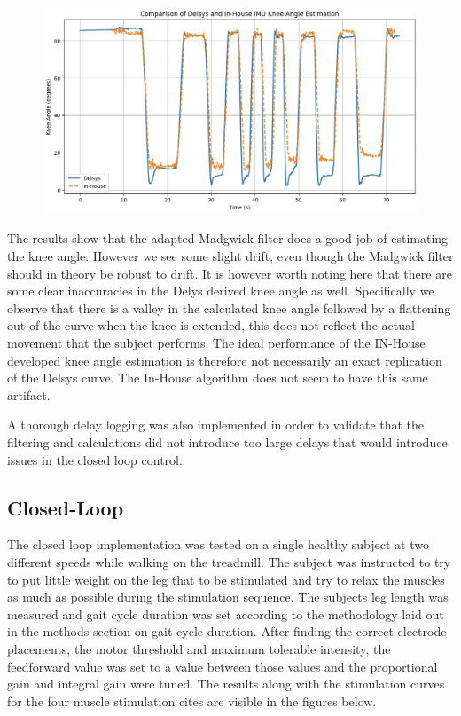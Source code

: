 \begin{figure} [H]
    \centering
    \includegraphics[width=0.95\linewidth]{images/T11_betterplotting.png}
    \caption{}
    \label{fig:t11}
\end{figure}

The results show that the adapted Madgwick filter does a good job of estimating the knee angle. However we see some slight drift, even though the Madgwick filter should in theory be robust to drift. It is however worth noting here that there are some clear inaccuracies in the Delys derived knee angle as well. Specifically we observe that there is a valley in the calculated knee angle followed by a flattening out of the curve when the knee is extended, this does not reflect the actual movement that the subject performs. The ideal performance of the IN-House developed knee angle estimation is therefore not necessarily an exact replication of the Delsys curve. The In-House algorithm does not seem to have this same artifact.

A thorough delay logging was also implemented in order to validate that the filtering and calculations did not introduce too large delays that would introduce issues in the closed loop control. 



\subsection{Closed-Loop}
The closed loop implementation was tested on a single healthy subject at two different speeds while walking on the treadmill. The subject was instructed to try to put little weight on the leg that to be stimulated and try to relax the muscles as much as possible during the stimulation sequence. The subjects leg length was measured and gait cycle duration was set according to the methodology laid out in the methods section on gait cycle duration. After finding the correct electrode placements, the motor threshold and maximum tolerable intensity, the feedforward value was set to a value between those values and the proportional gain and integral gain were tuned.  The results along with the stimulation curves for the four muscle stimulation cites are visible in the figures below.

